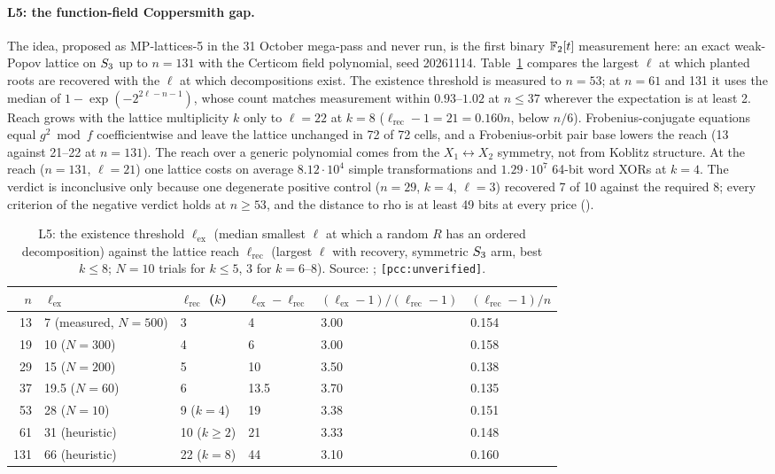 \paragraph{L5: the function-field Coppersmith gap.} The idea, proposed as
MP-lattices-5 in the 31 October mega-pass and never run, is the first
binary $\mathbb{F}_2[t]$ measurement here: an exact weak-Popov lattice on
$S_{3}$ up to $n=131$ with the Certicom field polynomial, seed 20261114.
Table~\ref{tab:bt-open7-ffc} compares the largest $\ell$ at which planted
roots are recovered with the $\ell$ at which decompositions exist. The
existence threshold is measured to $n=53$; at $n=61$ and 131 it uses the
median of $1-\exp(-2^{2\ell-n-1})$, whose count matches measurement within
$0.93$--$1.02$ at $n\le37$ wherever the expectation is at least 2. Reach
grows with the lattice multiplicity $k$ only to $\ell=22$ at $k=8$
($\ell_{\mathrm{rec}}-1=21=0.160n$, below $n/6$). Frobenius-conjugate equations equal $g^2\bmod
f$ coefficientwise and leave the lattice unchanged in 72 of 72 cells, and a
Frobenius-orbit pair base lowers the reach (13 against 21--22 at $n=131$).
The reach over a generic polynomial comes from the $X_1\leftrightarrow X_2$
symmetry, not from Koblitz structure. At the reach ($n=131$, $\ell=21$) one
lattice costs on average $8.12\cdot10^4$ simple transformations and $1.29\cdot10^7$
64-bit word XORs at $k=4$. The verdict is inconclusive only because one
degenerate positive control ($n=29$, $k=4$, $\ell=3$) recovered 7 of 10
against the required 8; every criterion of the negative verdict holds at
$n\ge53$, and the distance to rho is at least 49 bits at every price
().

\begin{table}[t]
\centering\small
\begin{tabular}{@{}rlllll@{}}
\toprule
$n$ & $\ell_{\mathrm{ex}}$ & $\ell_{\mathrm{rec}}$ ($k$) & $\ell_{\mathrm{ex}}-\ell_{\mathrm{rec}}$ & $(\ell_{\mathrm{ex}}-1)/(\ell_{\mathrm{rec}}-1)$ & $(\ell_{\mathrm{rec}}-1)/n$ \\
\midrule
13 & 7 (measured, $N=500$) & 3 & 4 & 3.00 & 0.154 \\
19 & 10 ($N=300$) & 4 & 6 & 3.00 & 0.158 \\
29 & 15 ($N=200$) & 5 & 10 & 3.50 & 0.138 \\
37 & 19.5 ($N=60$) & 6 & 13.5 & 3.70 & 0.135 \\
53 & 28 ($N=10$) & 9 ($k=4$) & 19 & 3.38 & 0.151 \\
61 & 31 (heuristic) & 10 ($k\ge2$) & 21 & 3.33 & 0.148 \\
131 & 66 (heuristic) & 22 ($k=8$) & 44 & 3.10 & 0.160 \\
\bottomrule
\end{tabular}
\caption[]{L5: the existence threshold $\ell_{\mathrm{ex}}$ (median smallest
$\ell$ at which a random $R$ has an ordered decomposition) against the
lattice reach $\ell_{\mathrm{rec}}$ (largest $\ell$ with recovery, symmetric
$S_{3}$ arm, best $k\le8$; $N=10$ trials for $k\le5$, 3 for $k=6$--8).
Source: ;
\texttt{[pcc:unverified]}.}
\label{tab:bt-open7-ffc}
\end{table}

